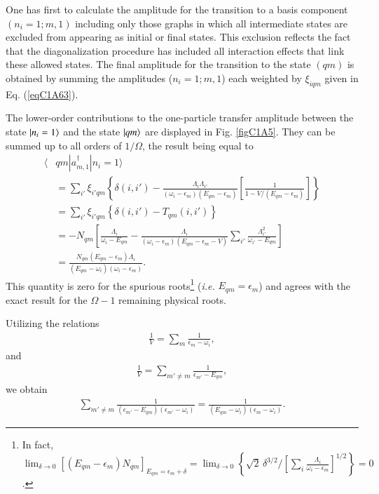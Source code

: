 One has  first to calculate the amplitude for the transition to a basis component $(n_i= 1; m, 1)$ including only those graphs in which all intermediate states are excluded from appearing as initial or final states. This exclusion reflects the fact that the diagonalization procedure has included all interaction effects that link these allowed states. The final amplitude for the transition to the state $(qm)$ is obtained by summing the amplitudes  ($n_i=1;m,1$) each weighted by  $\xi_{iqm}$ given in Eq. (\ref{eqC1A63}). 

The lower-order contributions to the one-particle transfer amplitude between the state $|{n_i=1} \rangle$ and the state $|{qm} \rangle$ are displayed in Fig. \ref{figC1A5}. They can be summed up to all orders of $1/\Omega$, the result being equal to 
  \begin{align}\label{eqC1A73} 
   \nonumber \langle & qm|a^\dagger_{m,1}|n_i=1\rangle\\
\nonumber &=\sum_{i'}\xi_{i'qm}\left\{\delta(i,i')-\frac{\Lambda_i\Lambda_{i'}}{(\omega_i-\epsilon_m)(E_{qm}-\epsilon_m)}\left[\frac{1}{1-V/(E_{qm}-\epsilon_m)}\right]\right\}\\
\nonumber &=\sum_{i'}\xi_{i'qm}\left\{\delta(i,i')-T_{qm}(i,i')\right\}\\
\nonumber & =-N_{qm}\left[\frac{\Lambda_i}{\omega_i-E_{qm}}-\frac{\Lambda_i}{(\omega_i-\epsilon_m)(E_{qm}-\epsilon_m-V)}\sum_{i'}\frac{\Lambda_{i'}^2}{\omega_{i'}-E_{qm}}\right]\\
&=\frac{N_{qm}(E_{qm}-\epsilon_m)\Lambda_i}{(E_{qm}-\omega_i)(\omega_i-\epsilon_m)}.
\end{align} 
This quantity is zero for the spurious roots\footnote{In fact, $\lim_{\delta\to0}[(E_{qm}-\epsilon_m)N_{qm}]_{E_{qm}=\epsilon_m+\delta}=\lim_{\delta\to0}\left\{\sqrt{2}\,\delta^{3/2}/[\sum_i\frac{\Lambda_i}{\omega_i-\epsilon_m}]^{1/2}\right\}=0$.} (\textit{i.e.} $E_{qm}=\epsilon_m$) and agrees with the exact result for the $\Omega-1$ remaining physical roots. 


Utilizing the relations
  \begin{align}\label{eqC1A74} 
  \frac{1}{V}=\sum_m\frac{1}{\epsilon_m-\omega_i},
    \end{align}  
and  
  \begin{align}\label{eqC1A75} 
   \frac{1}{V}=\sum_{m'\neq m}\frac{1}{\epsilon_{m'}-E_{qm}},
    \end{align} 
we  obtain  
  \begin{align}\label{eqC1A76} 
   \sum_{m'\neq m}\frac{1}{(\epsilon_{m'}-E_{qm})(\epsilon_{m'}-\omega_i)}=\frac{1}{(E_{qm}-\omega_i)(\epsilon_m-\omega_i)}.
    \end{align} 

